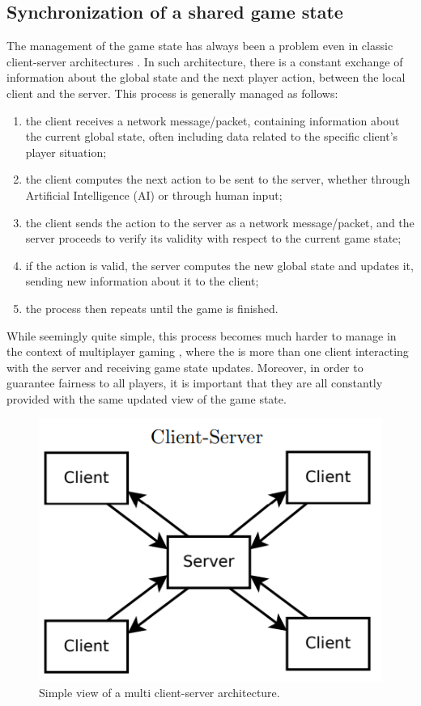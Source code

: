 \subsection{Synchronization of a shared game state}
The management of the game state has always been a problem even in classic client-server architectures \cite{womak:distributed-game-engine-android, womak:distributed-minecraft}. In such architecture, there is a constant exchange of information about the global state and the next player action, between the local client and the server. This process is generally managed as follows:
\begin{enumerate}
	\item the client receives a network message/packet, containing information about the current global state, often including data related to the specific client's player situation;
	\item the client computes the next action to be sent to the server, whether through Artificial Intelligence (AI) or through human input;
	\item the client sends the action to the server as a network message/packet, and the server proceeds to verify its validity with respect to the current game state;
	\item if the action is valid, the server computes the new global state and updates it, sending new information about it to the client;
	\item the process then repeats until the game is finished.
\end{enumerate}
While seemingly quite simple, this process becomes much harder to manage in the context of multiplayer gaming \cite{womak:rafting-multiplayer-games, womak:distributed-game-engine-android}, where the is more than one client interacting with the server and receiving game state updates. Moreover, in order to guarantee fairness to all players, it is important that they are all constantly provided with the same updated view of the game state.
\begin{figure}[h!]
	\centering
	\includegraphics[width=0.55\linewidth]{immagini/State-of-the-art/simple-client-server}
	\caption[Simple view of a multi client-server architecture.]{Simple view of a multi client-server architecture.}
	\label{fig:simple-client-server}
\end{figure}

